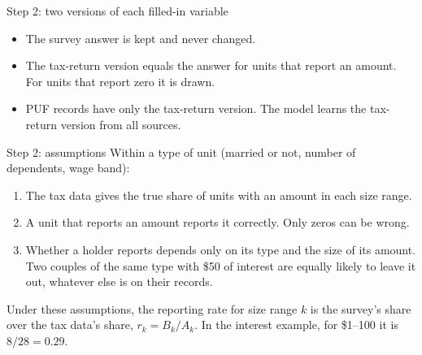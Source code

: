 \begin{frame}{Step 2: two versions of each filled-in variable}
  \centering

  \vspace{0.4em}
  \raggedright
  \small
  \begin{itemize}
    \item The survey answer is kept and never changed.
    \item The tax-return version equals the answer for units that report an amount. For units that
          report zero it is drawn.
    \item PUF records have only the tax-return version. The model learns the tax-return version from
          all sources.
  \end{itemize}
\end{frame}

\begin{frame}{Step 2: assumptions}
  Within a type of unit (married or not, number of dependents, wage band):
  \vspace{0.4em}
  \begin{enumerate}
    \item The tax data gives the true share of units with an amount in each size range.
    \vspace{0.3em}
    \item A unit that reports an amount reports it correctly. Only zeros can be wrong.
    \vspace{0.3em}
    \item Whether a holder reports depends only on its type and the size of its amount. Two
          couples of the same type with \$50 of interest are equally likely to leave it out,
          whatever else is on their records.
  \end{enumerate}
  \vspace{0.6em}
  Under these assumptions, the reporting rate for size range $k$ is the survey's share over the tax
  data's share, $r_k = B_k / A_k$. In the interest example, for \$1--100 it is $8 / 28 = 0.29$.
\end{frame}

